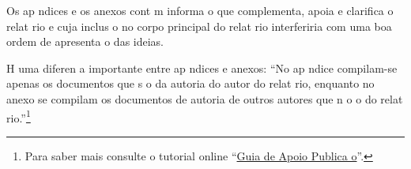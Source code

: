 \documentclass{article}
\begin{document}
\begin{infoopt}
Os ap ndices e os anexos cont m informa o que complementa, apoia e
clarifica o relat rio e cuja inclus o no corpo principal do relat rio
interferiria com uma boa ordem de apresenta o das ideias.

H  uma diferen a importante entre ap ndices e anexos: ``No ap ndice
compilam-se apenas os documentos que s o da autoria do autor do
relat rio, enquanto no anexo se compilam os documentos de autoria de
outros autores que n o o do relat rio.''\footnote{%
Para saber mais consulte o tutorial online 
``\href{https://docs.google.com/document/d/1TDC1behVq8x7fQL4CcPEEh_np5GXviJevQxnQ9gbiJs/edit}
{Guia de Apoio   Publica o}''.}
\end{infoopt}

\end{document}
